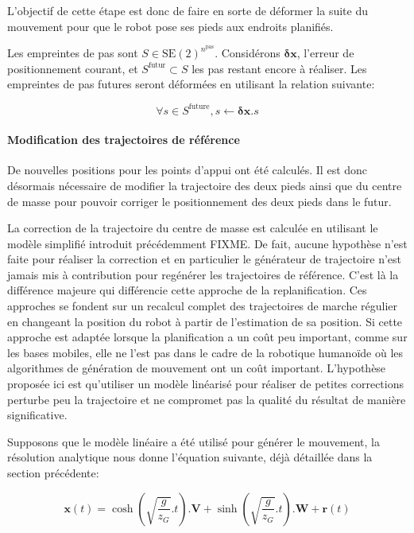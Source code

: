 L'objectif de cette étape est donc de faire en sorte de déformer la
suite du mouvement pour que le robot pose ses pieds aux endroits
planifiés.

Les empreintes de pas sont \mbox{$S \in
  \text{SE}(2)^{n^\text{pas}}$}. Considérons $\mathbf{\delta {x}}$,
l'erreur de positionnement courant, et \mbox{$S^{\text{futur}} \subset
  S$} les pas restant encore à réaliser. Les empreintes de pas futures
seront déformées en utilisant la relation suivante:

\begin{equation}\label{eq:footstepmodif}
  \forall s \in S^{\text{future}}, s \gets \mathbf{\delta {x}} . s
\end{equation}

\paragraph{Modification des trajectoires de référence}

De nouvelles positions pour les points d'appui ont été calculés. Il
est donc désormais nécessaire de modifier la trajectoire des deux
pieds ainsi que du centre de masse pour pouvoir corriger le
positionnement des deux pieds dans le futur.

La correction de la trajectoire du centre de masse est calculée en
utilisant le modèle simplifié introduit précédemment FIXME. De fait,
aucune hypothèse n'est faite pour réaliser la correction et en
particulier le générateur de trajectoire n'est jamais mis à
contribution pour regénérer les trajectoires de référence. C'est là la
différence majeure qui différencie cette approche de la
replanification. Ces approches se fondent sur un recalcul complet des
trajectoires de marche régulier en changeant la position du robot à
partir de l'estimation de sa position. Si cette approche est adaptée
lorsque la planification a un coût peu important, comme sur les bases
mobiles, elle ne l'est pas dans le cadre de la robotique humanoïde où
les algorithmes de génération de mouvement ont un coût
important. L'hypothèse proposée ici est qu'utiliser un modèle
linéarisé pour réaliser de petites corrections perturbe peu la
trajectoire et ne compromet pas la qualité du résultat de manière
significative.


Supposons que le modèle linéaire a été utilisé pour générer le
mouvement, la résolution analytique nous donne l'équation suivante,
déjà détaillée dans la section précédente:

\begin{equation} \label{eq:zmpsol}
  \mathbf{x}(t) = \cosh(\sqrt{\frac{g}{z_G}}.t) . \mathbf{V} + \sinh(\sqrt{\frac{g}{z_G}}.t) . \mathbf{W} + \mathbf{r}(t)
\end{equation}



